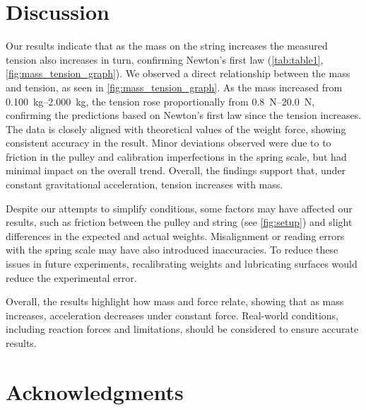 \documentclass[reprint,amsmath,amssymb,aps,twoside]{revtex4-2}
\begin{document}
        
    
\section{Discussion}

Our results indicate that as the mass on the string increases the measured tension also increases in turn, confirming Newton's first law (\cref{tab:table1}, \cref{fig:mass_tension_graph}). We observed a direct relationship between the mass and tension, as seen in \cref{fig:mass_tension_graph}. As the mass increased from \qtyrange{0.100}{2.000}{\kilo\gram}, the tension rose proportionally from \qtyrange{0.8}{20.0}{\newton}, confirming the predictions based on Newton's first law since the tension increases. The data is closely aligned with theoretical values of the weight force, showing consistent accuracy in the result. Minor deviations observed were due to to friction in the pulley and calibration imperfections in the spring scale, but had minimal impact on the overall trend. Overall, the findings support that, under constant gravitational acceleration, tension increases with mass. 
      
Despite our attempts to simplify conditions, some factors may have affected our results, such as friction between the pulley and string (see \cref{fig:setup}) and slight differences in the expected and actual weights. Misalignment or reading errors with the spring scale may have also introduced inaccuracies. To reduce these issues in future experiments, recalibrating weights and lubricating surfaces would reduce the experimental error.
        
Overall, the results highlight how mass and force relate, showing that as mass increases, acceleration decreases under constant force. Real-world conditions, including reaction forces and limitations, should be considered to ensure accurate results.






    
\section{Acknowledgments}
\end{document}
